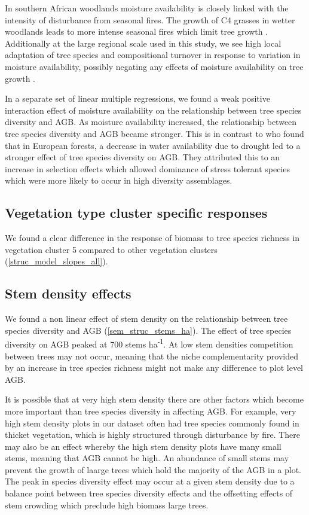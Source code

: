 \documentclass[11pt,a4paper]{article}
\begin{document}
In southern African woodlands moisture availability is closely linked with the intensity of disturbance from seasonal fires. The growth of C4 grasses in wetter woodlands leads to more intense seasonal fires which limit tree growth \citep{}. Additionally at the large regional scale used in this study, we see high local adaptation of tree species and compositional turnover in response to variation in moisture availability, possibly negating any effects of moisture availability on tree growth \citep{}.

In a separate set of linear multiple regressions, we found a weak positive interaction effect of moisture availability on the relationship between tree species diversity and AGB. As moisture availability increased, the relationship between tree species diversity and AGB became stronger. This is in contrast to \citet{Ratcliffe2017} who found that in European forests, a decrease in water availability due to drought led to a stronger effect of tree species diversity on AGB. They attributed this to an increase in selection effects which allowed dominance of stress tolerant species which were more likely to occur in high diversity assemblages. 

\subsection{Vegetation type cluster specific responses}

We found a clear difference in the response of biomass to tree species richness in vegetation cluster 5 compared to other vegetation clusters (\autoref{struc_model_slopes_all}).



\subsection{Stem density effects}

We found a non linear effect of stem density on the relationship between tree species diversity and AGB (\autoref{sem_struc_stems_ha}). The effect of tree species diversity on AGB peaked at \textapprox{}700 stems ha\textsuperscript{-1}. At low stem densities competition between trees may not occur, meaning that the niche complementarity provided by an increase in tree species richness might not make any difference to plot level AGB.

It is possible that at very high stem density there are other factors which become more important than tree species diversity in affecting AGB. For example, very high stem density plots in our dataset often had tree species commonly found in thicket vegetation, which is highly structured through disturbance by fire. There may also be an effect whereby the high stem density plots have many small stems, meaning that AGB cannot be high. An abundance of small stems may prevent the growth of laarge trees which hold the majority of the AGB in a plot. The peak in species diversity effect may occur at a given stem density due to a balance point between tree species diversity effects and the offsetting effects of stem crowding which preclude high biomass large trees.
\end{document}
